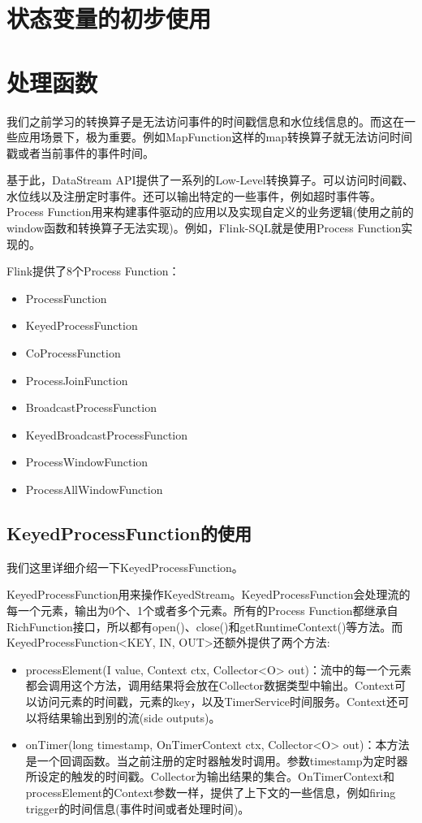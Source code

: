 \documentclass[cn,11pt,chinese]{elegantbook}
\begin{document}
\chapter{状态变量的初步使用}

\chapter{处理函数}

我们之前学习的转换算子是无法访问事件的时间戳信息和水位线信息的。而这在一些应用场景下，极为重要。例如MapFunction这样的map转换算子就无法访问时间戳或者当前事件的事件时间。

基于此，DataStream API提供了一系列的Low-Level转换算子。可以访问时间戳、水位线以及注册定时事件。还可以输出特定的一些事件，例如超时事件等。Process Function用来构建事件驱动的应用以及实现自定义的业务逻辑(使用之前的window函数和转换算子无法实现)。例如，Flink-SQL就是使用Process Function实现的。

Flink提供了8个Process Function：

\begin{itemize}
    \item ProcessFunction
    \item KeyedProcessFunction
    \item CoProcessFunction
    \item ProcessJoinFunction
    \item BroadcastProcessFunction
    \item KeyedBroadcastProcessFunction
    \item ProcessWindowFunction
    \item ProcessAllWindowFunction
\end{itemize}

\section{KeyedProcessFunction的使用}

我们这里详细介绍一下KeyedProcessFunction。

KeyedProcessFunction用来操作KeyedStream。KeyedProcessFunction会处理流的每一个元素，输出为0个、1个或者多个元素。所有的Process Function都继承自RichFunction接口，所以都有open()、close()和getRuntimeContext()等方法。而KeyedProcessFunction<KEY, IN, OUT>还额外提供了两个方法:

\begin{itemize}
    \item processElement(I value, Context ctx, Collector<O> out)：流中的每一个元素都会调用这个方法，调用结果将会放在Collector数据类型中输出。Context可以访问元素的时间戳，元素的key，以及TimerService时间服务。Context还可以将结果输出到别的流(side outputs)。
    \item onTimer(long timestamp, OnTimerContext ctx, Collector<O> out)：本方法是一个回调函数。当之前注册的定时器触发时调用。参数timestamp为定时器所设定的触发的时间戳。Collector为输出结果的集合。OnTimerContext和processElement的Context参数一样，提供了上下文的一些信息，例如firing trigger的时间信息(事件时间或者处理时间)。
\end{itemize}
\end{document}
